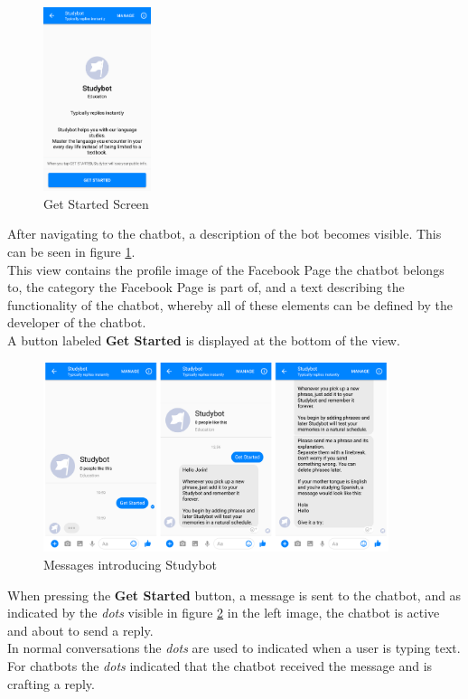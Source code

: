 \begin{figure}
  \centering
  \includegraphics[width=0.28\textwidth]{images/interface/02-getstarted.png}
	\caption{Get Started Screen}
	\label{fig:02-getstarted}
\end{figure}

After navigating to the chatbot,
a description of the bot becomes visible.
This can be seen in figure \ref{fig:02-getstarted}.
\\
This view contains the profile image of the Facebook Page the chatbot belongs to,
the category the Facebook Page is part of,
and a text describing the functionality of the chatbot,
whereby all of these elements can be defined by the developer of the chatbot.
\\
A button labeled \textbf{Get Started} is displayed at the bottom of the view.
\\

\begin{figure}[h]
  \centering
  \includegraphics[width=0.9\textwidth]{images/interface/03-welcome.png}
	\caption{Messages introducing Studybot}
	\label{fig:03-welcome}
\end{figure}

When pressing the \textbf{Get Started} button, a message is sent to the chatbot,
and as indicated by the \emph{dots} visible in figure \ref{fig:03-welcome} in the left image,
the chatbot is active and about to send a reply.
\\
In normal conversations the \emph{dots} are used to indicated when a user is typing text.
\\
For chatbots the \emph{dots} indicated that the chatbot received the message and is crafting a reply.
\\

